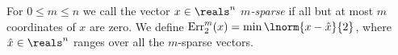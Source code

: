 For $0\le m\le n$ we call the vector $x\in\reals^n$ {\em
$m$-sparse} if all but at most $m$ coordinates of $x$ are zero.
We define $\err_2^m(x)=\min\lnorm{x-\hat x}{2}$, where $\hat
x\in\reals^n$ ranges over all the $m$-sparse vectors.




